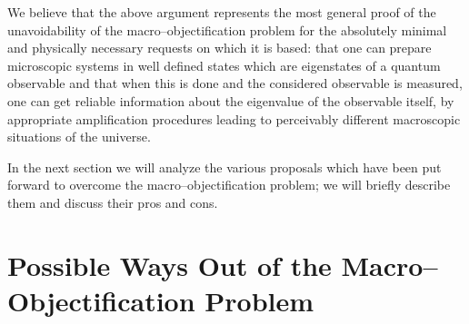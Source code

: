 \documentclass[10pt,a4paper]{article}
\begin{document}
We believe that the above argument represents the most general
proof of the unavoidability of  the macro--objectification problem
for the absolutely minimal and physically necessary requests on
which it is based: that  one can prepare microscopic systems in
well defined states which are eigenstates of a quantum observable
and that when this is done and the considered observable is
measured, one can  get reliable information about the eigenvalue
of the observable itself, by appropriate amplification procedures
leading to perceivably different macroscopic situations of the
universe.

In the next section we will analyze the various proposals which
have been put forward to overcome the macro--objectification
problem; we will briefly describe them and discuss their pros and
cons.

\section{Possible Ways Out of the Macro--Objecti\-fi\-ca\-ti\-on
Problem} \label{sec3}
\end{document}
